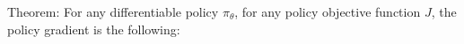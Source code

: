 \documentclass[preview]{standalone}
\begin{document}
\begin{center}
Theorem: For any differentiable policy $\pi_{\theta}$, for any policy objective function $J$, the policy gradient is the following:
\end{center}
\end{document}
